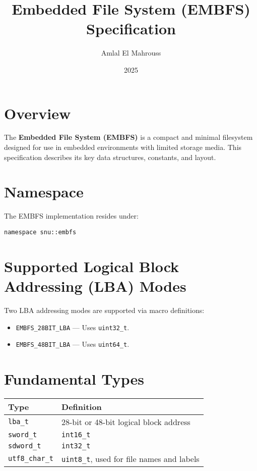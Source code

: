 \documentclass{article}
\title{Embedded File System (EMBFS) Specification}
\author{Amlal El Mahrouss}
\date{2025}
\begin{document}
\maketitle

\section{Overview}
The \textbf{Embedded File System (EMBFS)} is a compact and minimal filesystem designed for use in embedded environments with limited storage media. This specification describes its key data structures, constants, and layout.

\section{Namespace}
The EMBFS implementation resides under:
\begin{lstlisting}
namespace snu::embfs
\end{lstlisting}

\section{Supported Logical Block Addressing (LBA) Modes}
Two LBA addressing modes are supported via macro definitions:
\begin{itemize}
    \item \texttt{EMBFS\_28BIT\_LBA} — Uses \texttt{uint32\_t}.
    \item \texttt{EMBFS\_48BIT\_LBA} — Uses \texttt{uint64\_t}.
\end{itemize}

\section{Fundamental Types}
\begin{longtable}{|l|l|}
\hline
\textbf{Type} & \textbf{Definition} \\
\hline
\texttt{lba\_t} & 28-bit or 48-bit logical block address \\
\texttt{sword\_t} & \texttt{int16\_t} \\
\texttt{sdword\_t} & \texttt{int32\_t} \\
\texttt{utf8\_char\_t} & \texttt{uint8\_t}, used for file names and labels \\
\hline
\end{longtable}
\end{document}
